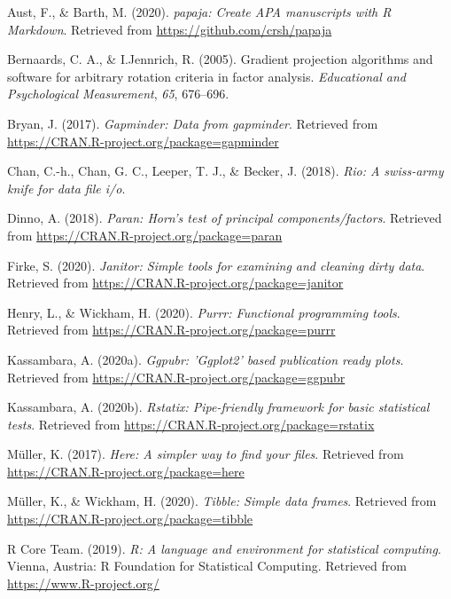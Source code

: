 \documentclass[
  english,
  man]{apa6}
\begin{document}
\hypertarget{refs}{}
\leavevmode\hypertarget{ref-R-papaja}{}%
Aust, F., \& Barth, M. (2020). \emph{papaja: Create APA manuscripts with R Markdown}. Retrieved from \url{https://github.com/crsh/papaja}

\leavevmode\hypertarget{ref-R-GPArotation}{}%
Bernaards, C. A., \& I.Jennrich, R. (2005). Gradient projection algorithms and software for arbitrary rotation criteria in factor analysis. \emph{Educational and Psychological Measurement}, \emph{65}, 676--696.

\leavevmode\hypertarget{ref-R-gapminder}{}%
Bryan, J. (2017). \emph{Gapminder: Data from gapminder}. Retrieved from \url{https://CRAN.R-project.org/package=gapminder}

\leavevmode\hypertarget{ref-R-rio}{}%
Chan, C.-h., Chan, G. C., Leeper, T. J., \& Becker, J. (2018). \emph{Rio: A swiss-army knife for data file i/o}.

\leavevmode\hypertarget{ref-R-paran}{}%
Dinno, A. (2018). \emph{Paran: Horn's test of principal components/factors}. Retrieved from \url{https://CRAN.R-project.org/package=paran}

\leavevmode\hypertarget{ref-R-janitor}{}%
Firke, S. (2020). \emph{Janitor: Simple tools for examining and cleaning dirty data}. Retrieved from \url{https://CRAN.R-project.org/package=janitor}

\leavevmode\hypertarget{ref-R-purrr}{}%
Henry, L., \& Wickham, H. (2020). \emph{Purrr: Functional programming tools}. Retrieved from \url{https://CRAN.R-project.org/package=purrr}

\leavevmode\hypertarget{ref-R-ggpubr}{}%
Kassambara, A. (2020a). \emph{Ggpubr: 'Ggplot2' based publication ready plots}. Retrieved from \url{https://CRAN.R-project.org/package=ggpubr}

\leavevmode\hypertarget{ref-R-rstatix}{}%
Kassambara, A. (2020b). \emph{Rstatix: Pipe-friendly framework for basic statistical tests}. Retrieved from \url{https://CRAN.R-project.org/package=rstatix}

\leavevmode\hypertarget{ref-R-here}{}%
Müller, K. (2017). \emph{Here: A simpler way to find your files}. Retrieved from \url{https://CRAN.R-project.org/package=here}

\leavevmode\hypertarget{ref-R-tibble}{}%
Müller, K., \& Wickham, H. (2020). \emph{Tibble: Simple data frames}. Retrieved from \url{https://CRAN.R-project.org/package=tibble}

\leavevmode\hypertarget{ref-R-base}{}%
R Core Team. (2019). \emph{R: A language and environment for statistical computing}. Vienna, Austria: R Foundation for Statistical Computing. Retrieved from \url{https://www.R-project.org/}
\end{document}
